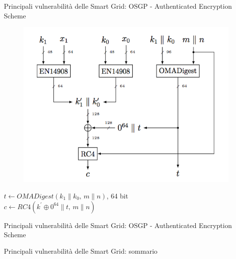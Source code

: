 \begin{frame}{Principali vulnerabilità delle Smart Grid: OSGP - Authenticated Encryption Scheme}
	\begin{figure}[t]
		\includegraphics[scale=0.35,cfbox=blue_slides 1pt 0pt]{imgs/osgp.png}
	\end{figure}
	{$t \gets OMADigest(k_1\|k_0,\,m\|n)$, 64 bit}\\
	{$c \gets RC4(k^{\prime} \oplus 0^{64}\|t,\,m\|n)$}
\end{frame}

\begin{frame}{Principali vulnerabilità delle Smart Grid: OSGP - Authenticated Encryption Scheme}
\end{frame}

\begin{frame}{Principali vulnerabilità delle Smart Grid: sommario}
\end{frame}

